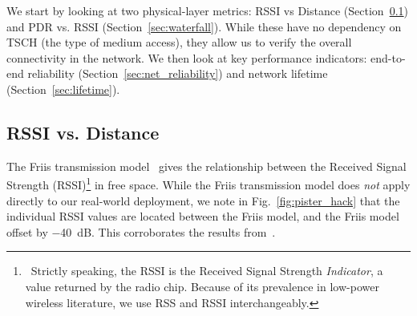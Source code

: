 \documentclass{elsarticle}
\begin{document}

We start by looking at two physical-layer metrics: RSSI vs Distance (Section~\ref{sec:rssi_distance}) and PDR vs. RSSI (Section~\ref{sec:waterfall}).
While these have no dependency on TSCH (the type of medium access), they allow us to verify the overall connectivity in the network.
We then look at key performance indicators: end-to-end reliability (Section~\ref{sec:net_reliability}) and network lifetime (Section~\ref{sec:lifetime}).

\subsection{RSSI vs. Distance}
\label{sec:rssi_distance}

The Friis transmission model~\cite{saunders07antennas} gives the relationship between the Received Signal Strength (RSSI)\footnote{~Strictly speaking, the RSSI is the Received Signal Strength \textit{Indicator}, a value returned by the radio chip. Because of its prevalence in low-power wireless literature, we use RSS and RSSI interchangeably.} in free space.
While the Friis transmission model  does \textit{not} apply directly to our real-world deployment, we note in Fig.~\ref{fig:pister_hack} that the individual RSSI values are located between the Friis model, and the Friis model offset by $-$40~dB.
This corroborates the results from~\cite{zats10wireless}.
\end{document}

